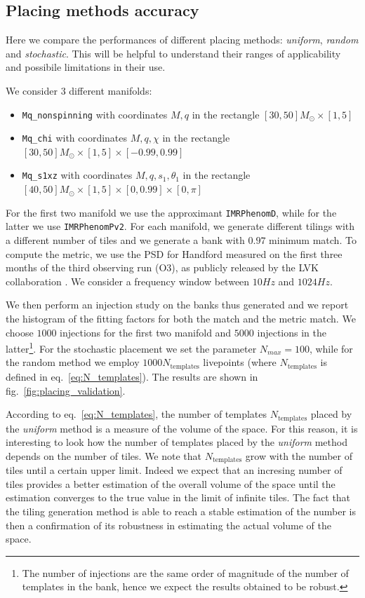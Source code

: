 \documentclass[twocolumn,showpacs,preprintnumbers,nofootinbib,prd,
superscriptaddress,10pt]{revtex4-2}
\begin{document}
\subsection{Placing methods accuracy} \label{sec:placing_accuracy}

Here we compare the performances of different placing methods: \textit{uniform}, \textit{random} and \textit{stochastic}.
This will be helpful to understand their ranges of applicability and possibile limitations in their use.

We consider 3 different manifolds:
\begin{itemize}
	\item \texttt{Mq\_nonspinning} with coordinates $M, q$ in the rectangle $[30, 50] M_\odot \times [1,5]$
	\item \texttt{Mq\_chi} with coordinates $M, q, \chi $ in the rectangle $[30, 50] M_\odot \times [1,5] \times [-0.99, 0.99]$
	\item \texttt{Mq\_s1xz} with coordinates $M, q, s_{1}, \theta_1$ in the rectangle $[40, 50] M_\odot \times [1,5] \times [0, 0.99] \times [0,\pi]$
\end{itemize}
For the first two manifold we use the approximant \texttt{IMRPhenomD}, while for the latter we use \texttt{IMRPhenomPv2}.
For each manifold, we generate different tilings with a different number of tiles and we generate a bank with $0.97$ minimum match.
To compute the metric, we use the PSD for Handford measured on the first three months of the third observing run (O3), as publicly released by the LVK collaboration \cite{https://dcc.ligo.org/LIGO-T2000012/public}.
We consider a frequency window between $10Hz$ and $1024Hz$.

We then perform an injection study on the banks thus generated and we report the histogram of the fitting factors for both the match and the metric match. We choose $1000$ injections for the first two manifold and $5000$ injections in the latter\footnote{
The number of injections are the same order of magnitude of the number of templates in the bank, hence we expect the results obtained to be robust.}.
For the stochastic placement we set the parameter $N_{max} = 100$, while for the random method we employ $1000 N_{\text{templates}}$ livepoints (where $N_{\text{templates}}$ is defined in eq.~\eqref{eq:N_templates}).
The results are shown in fig.~\ref{fig:placing_validation}.

According to eq.~\eqref{eq:N_templates}, the number of templates $N_{\text{templates}}$ placed by the {\it uniform} method is a measure of the volume of the space. For this reason, it is interesting to look how the number of templates placed by the {\it uniform} method depends on the number of tiles.
We note that $N_{\text{templates}}$ grow with the number of tiles until a certain upper limit. Indeed we expect that an incresing number of tiles provides a better estimation of the overall volume of the space until the estimation converges to the true value in the limit of infinite tiles. 
The fact that the tiling generation method is able to reach a stable estimation of the number is then a confirmation of its robustness in estimating the actual volume of the space.
\end{document}
